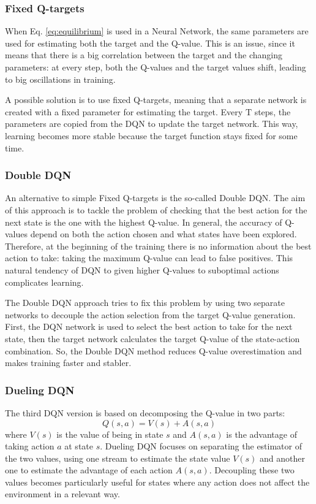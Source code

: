 \documentclass[a4paper, 12pt]{article}
\numberwithin{equation}{section}
\begin{document}
\subsubsection{Fixed Q-targets}

When Eq. \eqref{eq:equilibrium} is used in a Neural Network, the same parameters are used for estimating both the target and the Q-value. This is an issue, since it means that there is a big correlation between the target and the changing parameters: at every step, both the Q-values and the target values shift, leading to big oscillations in training.

A possible solution is to use fixed Q-targets, meaning that a separate network is created with a fixed parameter for estimating the target. Every $\mathrm{T}$ steps, the parameters are copied from the DQN to update the target network. This way, learning becomes more stable because the target function stays fixed for some time.

\subsubsection{Double DQN}

An alternative to simple Fixed Q-targets is the so-called Double DQN. The aim of this approach is to tackle the problem of checking that the best action for the next state is the one with the highest Q-value. In general, the accuracy of Q-values depend on both the action chosen and what states have been explored. Therefore, at the beginning of the training there is no information about the best action to take: taking the maximum Q-value can lead to false positives. This natural tendency of DQN to given higher Q-values to suboptimal actions complicates learning.

The Double DQN approach tries to fix this problem by using two separate networks to decouple the action selection from the target Q-value generation. First, the DQN network is used to select the best action to take for the next state, then the target network calculates the target Q-value of the state-action combination. So, the Double DQN method reduces Q-value overestimation and makes training faster and stabler.

\subsubsection{Dueling DQN}

The third DQN version is based on decomposing the Q-value in two parts:
\begin{equation}
	Q\left(s,a\right)=V\left(s\right)+A\left(s,a\right)
\end{equation}
where $V\left(s\right)$ is the value of being in state $s$ and $A\left(s,a\right)$ is the advantage of taking action $a$ at state $s$. Dueling DQN focuses on separating the estimator of the two values, using one stream to estimate the state value $V\left(s\right)$ and another one to estimate the advantage of each action $A\left(s,a\right)$. Decoupling these two values becomes particularly useful for states where any action does not affect the environment in a relevant way.
\end{document}
